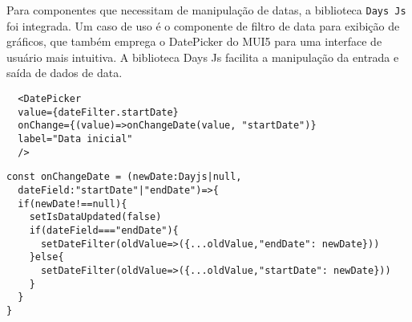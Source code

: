 Para componentes que necessitam de manipulação de datas, a biblioteca \texttt{Days Js} \cite{dayJsInstallation} foi integrada. Um caso de uso é o componente de filtro de data para exibição de gráficos, que também emprega o DatePicker \cite{muiDatePickerValidation} do \gls{MUI5} para uma interface de usuário mais intuitiva. A biblioteca Days Js facilita a manipulação da entrada e saída de dados de data.

\begin{verbatim}
  <DatePicker
  value={dateFilter.startDate}
  onChange={(value)=>onChangeDate(value, "startDate")}
  label="Data inicial"
  />
\end{verbatim}

\begin{verbatim}
const onChangeDate = (newDate:Dayjs|null, 
  dateField:"startDate"|"endDate")=>{
  if(newDate!==null){
    setIsDataUpdated(false)
    if(dateField==="endDate"){
      setDateFilter(oldValue=>({...oldValue,"endDate": newDate}))
    }else{
      setDateFilter(oldValue=>({...oldValue,"startDate": newDate}))
    }
  }
}
\end{verbatim}


